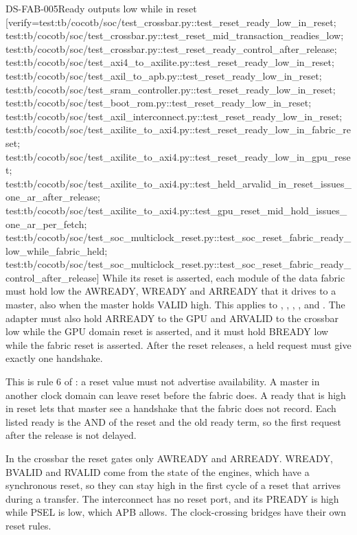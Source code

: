 \begin{requirement}{DS-FAB-005}{Ready outputs low while in reset}
[verify={test:tb/cocotb/soc/test_crossbar.py::test_reset_ready_low_in_reset; test:tb/cocotb/soc/test_crossbar.py::test_reset_mid_transaction_readies_low; test:tb/cocotb/soc/test_crossbar.py::test_reset_ready_control_after_release; test:tb/cocotb/soc/test_axi4_to_axilite.py::test_reset_ready_low_in_reset; test:tb/cocotb/soc/test_axil_to_apb.py::test_reset_ready_low_in_reset; test:tb/cocotb/soc/test_sram_controller.py::test_reset_ready_low_in_reset; test:tb/cocotb/soc/test_boot_rom.py::test_reset_ready_low_in_reset; test:tb/cocotb/soc/test_axil_interconnect.py::test_reset_ready_low_in_reset; test:tb/cocotb/soc/test_axilite_to_axi4.py::test_reset_ready_low_in_fabric_reset; test:tb/cocotb/soc/test_axilite_to_axi4.py::test_reset_ready_low_in_gpu_reset; test:tb/cocotb/soc/test_axilite_to_axi4.py::test_held_arvalid_in_reset_issues_one_ar_after_release; test:tb/cocotb/soc/test_axilite_to_axi4.py::test_gpu_reset_mid_hold_issues_one_ar_per_fetch; test:tb/cocotb/soc/test_soc_multiclock_reset.py::test_soc_reset_fabric_ready_low_while_fabric_held; test:tb/cocotb/soc/test_soc_multiclock_reset.py::test_soc_reset_fabric_ready_control_after_release}]
While its reset is asserted, each module of the data fabric must hold low the AWREADY, WREADY and ARREADY that it drives to a master, also when the master holds VALID high. This applies to , , , ,  and . The adapter  must also hold ARREADY to the GPU and ARVALID to the crossbar low while the GPU domain reset is asserted, and it must hold BREADY low while the fabric reset is asserted. After the reset releases, a held request must give exactly one handshake.
\end{requirement}
\begin{rationale}
This is rule 6 of : a reset value must not advertise availability. A master in another clock domain can leave reset before the fabric does. A ready that is high in reset lets that master see a handshake that the fabric does not record. Each listed ready is the AND of the reset and the old ready term, so the first request after the release is not delayed.
\end{rationale}
\begin{information}
In the crossbar the reset gates only AWREADY and ARREADY. WREADY, BVALID and RVALID come from the state of the engines, which have a synchronous reset, so they can stay high in the first cycle of a reset that arrives during a transfer. The interconnect  has no reset port, and its PREADY is high while PSEL is low, which APB allows. The clock-crossing bridges have their own reset rules.
\end{information}

